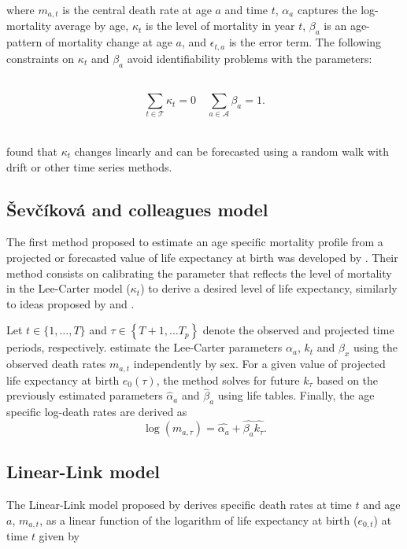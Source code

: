 \documentclass[a4,11pt]{article}
\begin{document}
where $m_{a,t}$ is the central death rate at age $a$ and time $t$, $\alpha_{a}$ captures the log-mortality average by age, $\kappa_{t}$ is the level of mortality in year $t$, $\beta_{a}$ is an age-pattern of mortality change at age $a$, and $\epsilon_{t,a}$ is the error term. The following constraints on $\kappa_{t}$ and $\beta_{a}$ avoid identifiability problems with the parameters:

\,
$$\sum_{t \in \mathcal{T}}{\kappa_{t}}=0 \quad \sum_{a \in \mathcal{A}}{\beta_a}=1.$$
\,

\citet{LC1992} found that $\kappa_{t}$ changes linearly and can be forecasted using a random walk with drift or other time series methods.

\subsection{ \v{S}ev\v{c}\'{i}kov\'{a} and colleagues model}

The first method proposed to estimate an age specific mortality profile from a projected or forecasted value of life expectancy at birth was developed by \cite{Sevcikova}. Their method consists on calibrating the parameter that reflects the level of mortality in the Lee-Carter model ($\kappa_{t}$) to derive a desired level of life expectancy, similarly to ideas proposed by \cite{lee01} and \cite{li2013}. 

Let $t \in\{1, \ldots, T\}$ and $\tau \in\left\{T+1, \ldots T_{p}\right\}$ denote the observed and projected time periods, respectively. \cite{Sevcikova} estimate the Lee-Carter parameters $\alpha_{a}$, $k_t$ and $\beta_{x}$ using the observed death rates $m_{a,t}$ independently by sex. For a given value of projected life expectancy at birth $e_{0}(\tau)$, the method solves for future $k_{\tau}$ based on the previously estimated parameters $\hat{\alpha}_{a}$ and $\hat{\beta}_{a}$ using life tables. Finally, the age specific log-death rates are derived as
\begin{equation*} 
	\log{\left(m_{a,\tau}\right)}=\hat{\alpha_{a}}+\hat{\beta_{a}} \hat{k_{\tau}}.
\end{equation*}

\subsection{Linear-Link model}

The Linear-Link model proposed by \citet{PascariuLL} derives specific death rates at time $t$ and age $a$, $m_{a,t}$, as a linear function of the logarithm of life expectancy at birth ($e_{0,t}$) at time $t$ given by
\end{document}
